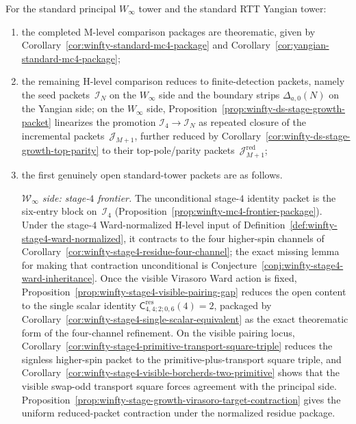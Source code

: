 \begin{proposition}
\label{prop:paired-standard-mc4-frontier}
For the standard principal
\texorpdfstring{$W_\infty$}{W_infty} tower and the standard RTT Yangian
tower:
\begin{enumerate}[label=\textup{(\alph*)}]
\item the completed M-level comparison packages are theorematic,
  given by
  Corollary~\ref{cor:winfty-standard-mc4-package} and
  Corollary~\ref{cor:yangian-standard-mc4-package};
\item the remaining H-level comparison reduces to finite-detection
  packets, namely the seed packets~$\mathcal{I}_N$ on the
  \texorpdfstring{$W_\infty$}{W_infty} side and the boundary strips
  $\Delta_{a,0}(N)$ on the Yangian side; on the
  \texorpdfstring{$W_\infty$}{W_infty} side,
  Proposition~\ref{prop:winfty-ds-stage-growth-packet} linearizes the
  promotion $\mathcal{I}_4\to\mathcal{I}_N$ as repeated closure of the
  incremental packets~$\mathcal{J}_{M+1}$, further reduced by
  Corollary~\ref{cor:winfty-ds-stage-growth-top-parity} to their
  top-pole/parity packets~$\mathcal{J}_{M+1}^{\mathrm{red}}$;
\item the first genuinely open standard-tower packets are as follows.

  \emph{$\mathcal{W}_\infty$ side: stage-$4$ frontier.}
  The unconditional stage-$4$ identity packet is the six-entry block
  on~$\mathcal{I}_4$
  (Proposition~\ref{prop:winfty-mc4-frontier-package}).  Under the
  stage-$4$ Ward-normalized H-level input of
  Definition~\ref{def:winfty-stage4-ward-normalized}, it contracts to
  the four higher-spin channels of
  Corollary~\ref{cor:winfty-stage4-residue-four-channel}; the exact
  missing lemma for making that contraction unconditional is
  Conjecture~\ref{conj:winfty-stage4-ward-inheritance}.  Once the
  visible Virasoro Ward action is fixed,
  Proposition~\ref{prop:winfty-stage4-visible-pairing-gap} reduces the
  open content to the single scalar identity
  $\mathsf{C}^{\mathrm{res}}_{4,4;2;0,6}(4)=2$, packaged by
  Corollary~\ref{cor:winfty-stage4-single-scalar-equivalent} as the
  exact theorematic form of the four-channel refinement.  On the
  visible pairing locus,
  Corollary~\ref{cor:winfty-stage4-primitive-transport-square-triple}
  reduces the signless higher-spin packet to the
  primitive-plus-transport square triple, and
  Corollary~\ref{cor:winfty-stage4-visible-borcherds-two-primitive}
  shows that the visible swap-odd transport square forces agreement
  with the principal side.
  Proposition~\ref{prop:winfty-stage-growth-virasoro-target-contraction}
  gives the uniform reduced-packet contraction under the normalized
  residue package.


\end{enumerate}
\end{proposition}
